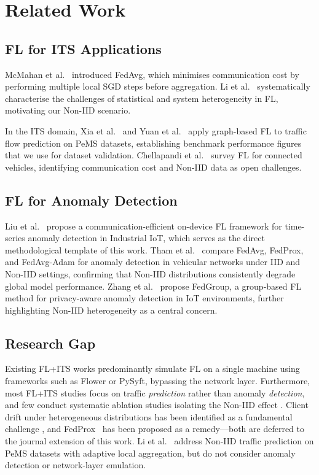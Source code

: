 \documentclass[conference]{IEEEtran}
\begin{document}
\section{Related Work}

\subsection{FL for ITS Applications}

McMahan et al.~\cite{mcmahan2017communication} introduced FedAvg, which
minimises communication cost by performing multiple local SGD steps
before aggregation.
Li et al.~\cite{li2020federated} systematically characterise the
challenges of statistical and system heterogeneity in FL, motivating our
Non-IID scenario.

In the ITS domain, Xia et al.~\cite{xia2023short} and
Yuan et al.~\cite{yuan2023fedSTN} apply graph-based FL to traffic flow
prediction on PeMS datasets, establishing benchmark performance figures
that we use for dataset validation.
Chellapandi et al.~\cite{chellapandi2024federated} survey FL for
connected vehicles, identifying communication cost and Non-IID data as
open challenges.

\subsection{FL for Anomaly Detection}

Liu et al.~\cite{liu2021deep} propose a communication-efficient
on-device FL framework for time-series anomaly detection in Industrial
IoT, which serves as the direct methodological template of this work.
Tham et al.~\cite{tham2023federated} compare FedAvg, FedProx, and
FedAvg-Adam for anomaly detection in vehicular networks under IID and
Non-IID settings, confirming that Non-IID distributions consistently
degrade global model performance.
Zhang et al.~\cite{zhang2024fedgroup} propose FedGroup, a group-based
FL method for privacy-aware anomaly detection in IoT environments,
further highlighting Non-IID heterogeneity as a central concern.

\subsection{Research Gap}

Existing FL+ITS works predominantly simulate FL on a single machine
using frameworks such as Flower or PySyft, bypassing the network layer.
Furthermore, most FL+ITS studies focus on traffic \textit{prediction}
rather than anomaly \textit{detection}, and few conduct systematic
ablation studies isolating the Non-IID effect
\cite{zhang2024federated,kairouz2021advances}.
Client drift under heterogeneous distributions has been identified as
a fundamental challenge \cite{li2020federated}, and
FedProx~\cite{li2020fedprox} has been proposed as a remedy---both are
deferred to the journal extension of this work.
Li et al.~\cite{li2025fedgdan} address Non-IID traffic prediction on
PeMS datasets with adaptive local aggregation, but do not consider
anomaly detection or network-layer emulation.
\end{document}
